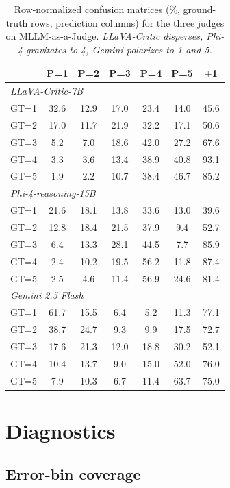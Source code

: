\documentclass{article}
\begin{document}
\begin{table}[t]
\centering
\caption{Row-normalized confusion matrices (\%, ground-truth rows, prediction columns) for the three judges on MLLM-as-a-Judge. \textit{LLaVA-Critic disperses, Phi-4 gravitates to 4, Gemini polarizes to 1 and 5.}}
\label{tab:confusion}
\small
\begin{tabular}{l|ccccc|c}
\toprule
& \textbf{P=1} & \textbf{P=2} & \textbf{P=3} & \textbf{P=4} & \textbf{P=5} & $\pm$\textbf{1} \\
\midrule
\multicolumn{7}{l}{\emph{LLaVA-Critic-7B}} \\
GT=1 & 32.6 & 12.9 & 17.0 & 23.4 & 14.0 & 45.6 \\
GT=2 & 17.0 & 11.7 & 21.9 & 32.2 & 17.1 & 50.6 \\
GT=3 & 5.2 & 7.0 & 18.6 & 42.0 & 27.2 & 67.6 \\
GT=4 & 3.3 & 3.6 & 13.4 & 38.9 & 40.8 & 93.1 \\
GT=5 & 1.9 & 2.2 & 10.7 & 38.4 & 46.7 & 85.2 \\
\midrule
\multicolumn{7}{l}{\emph{Phi-4-reasoning-15B}} \\
GT=1 & 21.6 & 18.1 & 13.8 & 33.6 & 13.0 & 39.6 \\
GT=2 & 12.8 & 18.4 & 21.5 & 37.9 & 9.4 & 52.7 \\
GT=3 & 6.4 & 13.3 & 28.1 & 44.5 & 7.7 & 85.9 \\
GT=4 & 2.4 & 10.2 & 19.5 & 56.2 & 11.8 & 87.4 \\
GT=5 & 2.5 & 4.6 & 11.4 & 56.9 & 24.6 & 81.4 \\
\midrule
\multicolumn{7}{l}{\emph{Gemini 2.5 Flash}} \\
GT=1 & 61.7 & 15.5 & 6.4 & 5.2 & 11.3 & 77.1 \\
GT=2 & 38.7 & 24.7 & 9.3 & 9.9 & 17.5 & 72.7 \\
GT=3 & 17.6 & 21.3 & 12.0 & 18.8 & 30.2 & 52.1 \\
GT=4 & 10.4 & 13.7 & 9.0 & 15.0 & 52.0 & 76.0 \\
GT=5 & 7.9 & 10.3 & 6.7 & 11.4 & 63.7 & 75.0 \\
\bottomrule
\end{tabular}
\end{table}

\section{Diagnostics}
\label{app:diag}

\subsection{Error-bin coverage}
\label{app:error_bins}
\end{document}
